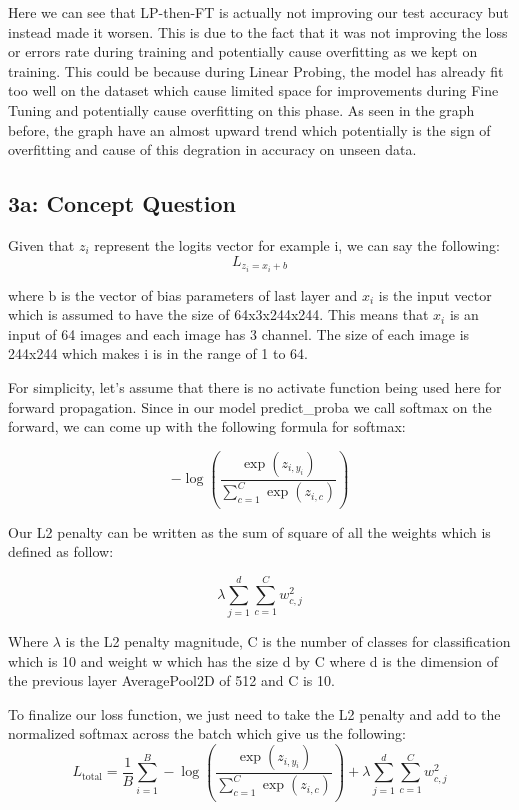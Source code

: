 \documentclass[10pt]{article}
\begin{document}
Here we can see that LP-then-FT is actually not improving our test accuracy but
instead made it worsen. This is due to the fact that it was not improving the
loss or errors rate during training and potentially cause overfitting as we kept
on training. This could be because during Linear Probing, the model has already
fit too well on the dataset which cause limited space for improvements during
Fine Tuning and potentially cause overfitting on this phase. As seen in the
graph before, the graph have an almost upward trend which potentially is the
sign of overfitting and cause of this degration in accuracy on unseen data.

\newpage

\subsection{3a: Concept Question}

Given that $z_i$ represent the logits vector for example i, we can say the
following:
\[
  L_{z_i = x_i + b}
\]

where b is the vector of bias parameters of last layer and $x_i$ is the input
vector which is assumed to have the size of 64x3x244x244. This means that $x_i$
is an input of 64 images and each image has 3 channel. The size of each image is
244x244 which makes i is in the range of 1 to 64.

For simplicity, let's assume that there is no activate function being used here
for forward propagation.
Since in our model predict\_proba we call softmax on the forward, we can come up with the
following formula for softmax:

\[
  {-\log\left( \frac{\exp(z_{i, y_i})}{\sum_{c=1}^{C} \exp(z_{i, c})} \right)}
\]

Our L2 penalty can be written as the sum of square of all the weights which is
defined as follow:

\[
\lambda \sum_{j=1}^{d} \sum_{c=1}^{C} w_{c,j}^2
\]

Where $\lambda$ is the L2 penalty magnitude, C is the number of classes for
classification which is 10 and weight w which has the size d by C where d is the
dimension of the previous layer AveragePool2D of 512 and C is 10.

To finalize our loss function, we just need to take the L2 penalty and add to the normalized softmax
across the batch which give us the following:
\[
L_{\text{total}} = \frac{1}{B} \sum_{i=1}^{B} -\log\left( \frac{\exp(z_{i, y_i})}{\sum_{c=1}^{C} \exp(z_{i, c})} \right) + \lambda \sum_{j=1}^{d} \sum_{c=1}^{C} w_{c,j}^2
\]
\end{document}
